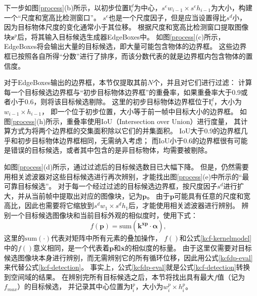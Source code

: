 下一步如图\ref{process}(b)所示，以初步位置$\mathbf{l}^d_i$为中心，$s^ew_{i-1}\times s^eh_{i-1}$为大小，构建一个``尺度和宽高比检测窗口''。
$s^e$也是一个尺度因子，但是应当设置得比$s^d$小，因为目标物体尺度的变化通常小于其位移。
根据尺度和宽高比检测窗口提取图像块$\mathbf{z}^p$后，将其输入目标候选生成器EdgeBoxes中。
如图\ref{process}(c)所示，EdgeBoxes将会输出大量的目标候选，即大量可能包含物体的边界框。
这些边界框已按照各自所得``分数''进行了排序，而该分数代表的就是边界框内包含物体的置信度。

对于EdgeBoxes输出的边界框，本节仅提取其前$N$个，并且对它们进行过滤：
计算每一个目标候选边界框与``初步目标物体边界框''的重叠率，如果重叠率大于0.9或者小于0.6，则将该目标候选剔除。
这里的初步目标物体边界框位于$\mathbf{l}^d_i$，大小为$w_{i-1}\times h_{i-1}$，
即一个位于初步位置，大小等于前一帧中目标大小的边界框。
如图\ref{process}(h)所示，重叠率使用IoU（Intersection over Union）进行度量，
其计算方式为将两个边界框的交集面积除以它们的并集面积。
IoU大于0.9的边界框几乎和初步目标物体边界框相同，无需纳入考虑；
而IoU小于0.6的边界框很有可能是错误的目标候选，或者其中包含的是非目标物体，均需要被剔除。

如图\ref{process}(d)所示，通过过滤后的目标候选数目已大幅下降。
但是，仍然需要用相关滤波器对这些目标候选进行再次辨别，才能找出图\ref{process}(e)中所示的``最可靠目标候选''。
对于每一个经过过滤的目标候选边界框，按尺度因子$s^d$进行扩大，并从当前帧中提取出对应的图像块，记为$\mathbf{p}$。
由于$\mathbf{p}$可能具有任意的尺度和宽高比，因此也需要将它缩放到$s^dw_1\times s^dh_1$后，才能使用相关滤波器进行辨别。
辨别一个目标候选图像块和当前目标外观的相似度时，使用下式：
\begin{equation}
	f(\mathbf{p})=\text{sum}(\mathbf{k}^{\overline{\mathbf{x}}\mathbf{p}}\cdot{\boldsymbol{\alpha}}),\label{kcfdp-eval}
\end{equation}
这里的$\text{sum}(\cdot)$代表对矩阵中所有元素的叠加操作，
$f()$和公式\ref{kcf-kernelmodel}中的$f()$意义相同，是一个代表着$\mathbf{p}$和$\overline{\mathbf{x}}$的相似度的标量。
由于这里仅需要对目标候选图像块本身进行辨别，而无需辨别它的所有循环位移，因此用公式\ref{kcfdp-eval}来代替公式\ref{kcf-detection}。
事实上，公式\ref{kcfdp-eval}就是公式\ref{kcf-detection}转换到空间域的结果。
在辨别完所有目标候选之后，本节将找出具有最大$f$值（记为$f_{max}$）的目标候选，
并记录其中心位置为$\mathbf{l}^{p}_i$，大小为$w^p_i\times h^p_i$。

